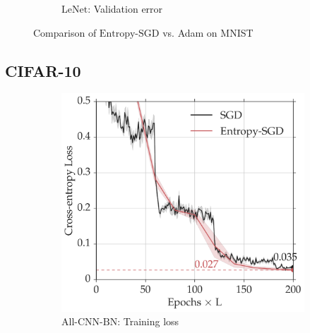 \documentclass[10pt]{article}
\newcommand{\entropysgd}{\mathrm{Entropy}\textrm{-}\mathrm{SGD}}
\newcommand{\lenet}{\textrm{LeNet}}
\newcommand{\allcnn}{\textrm{All-CNN-BN}}
\begin{document}
\begin{figure}[htp!]
\begin{subfigure}[t]{0.4\textwidth}
        \caption{\small $\lenet$: Validation error}
        \label{fig:lenet_test}
    \end{subfigure}
\caption{\small Comparison of $\entropysgd$ vs. Adam on MNIST\vspace*{0.15in}}
\label{fig:mnist_test}
\end{figure}

\subsection{CIFAR-10}
\label{ss:expt:cifar}

\begin{figure}[htp!]
\centering
    \begin{subfigure}[b]{0.4\textwidth}
        \centering
        \includegraphics[width=1.02\textwidth]{allcnn_loss.pdf}
        \caption{\small $\allcnn$: Training loss}
        \label{fig:allcnn_loss}
    \end{subfigure}
    \hspace{0.2in}
    \begin{subfigure}[b]{0.4\textwidth}
        \centering

\end{subfigure}
\end{figure}
\end{document}

